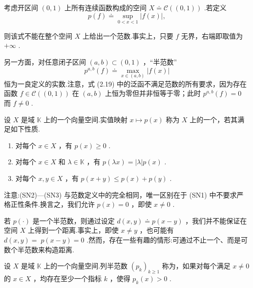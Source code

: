 \begin{instance}
考虑开区间 $(0,1)$ 上所有连续函数构成的空间 $X \doteq  \mathcal{C}\left( {( 0,1) }\right)$ .若定义
\[
p\left( f\right)  \doteq  \mathop{\sup }\limits_{{0 < x < 1}}\left| {f\left( x\right) }\right| ,
\]

则该式不能在整个空间 $X$ 上给出一个范数.事实上，只要 $f$ 无界，右端即取值为 $+ \infty$ .

另一方面，对任意闭子区间 $\left({a,b}\right)\subset (0,1)$ ，“半范数”
\begin{equation}\tag{2.19}
{p}^{a,b}\left( f\right)  \doteq  \mathop{\max }\limits_{x \in (a,b)}\left| {f\left( x\right) }\right|
\end{equation}
恒为一良定义的实数.注意，式 (2.19) 中的泛函不满足范数的所有要求，因为存在函数 $f \in  \mathcal{C}\left( {( 0,1) }\right)$ 在 $\left({a,b}\right)$ 上恒为零但并非恒等于零；此时 ${p}^{a,b}\left( f\right)  = 0$ 而 $f \neq  0$ .
\end{instance}
\begin{definition}[半范数]
    设 $X$ 是域 $\mathbb{K}$ 上的一个向量空间.实值映射 $x \mapsto  p\left( x\right)$ 称为 $X$ 上的一个，若其满足如下性质.
\begin{enumerate}[label=(SN\arabic*),leftmargin=3.5em]
    \item 对每个 $x \in  X$ ，有 $p\left( x\right)  \geq  0$ .
    \item 对每个 $x \in  X$ 和 $\lambda  \in  \mathbb{K}$ ，有 $p\left( {\lambda x}\right)  = \left| \lambda \right| p\left( x\right)$ .
    \item 对每个 $x,y \in  X$ ，有 $p\left( {x + y}\right)  \leq  p\left( x\right)  + p\left( y\right)$ .
\end{enumerate}

\end{definition}

注意:(SN2)---(SN3) 与范数定义中的完全相同，唯一区别在于 (SN1) 中不要求严格正性条件.换言之，我们允许 $p\left( x\right)  = 0$ ，即使 $x \neq  0$ .

若 $p\left( \cdot \right)$ 是一个半范数，则通过设定 $d\left( {x,y}\right)  \doteq  p\left( {x - y}\right)$ ，我们并不能保证在空间 $X$ 上得到一个距离.事实上，即使 $x \neq  y$ ，也可能有 $d\left( {x,y}\right)  = \; p\left( {x - y}\right)  = 0$ .然而，存在一些有趣的情形:可通过不止一个、而是可数个半范数来构造距离.
\begin{definition}[分离]
    设 $X$ 是域 $\mathbb{K}$ 上的一个向量空间.列半范数 ${\left( {p}_{k}\right) }_{k \geq  1}$ 称为，如果对每个满足 $x \neq  0$ 的 $x \in  X$ ，均存在至少一个指标 $k$ ，使得 ${p}_{k}\left( x\right)  > 0$ .
\end{definition}

